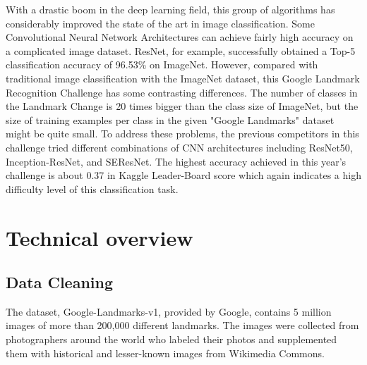 \documentclass[10pt,twocolumn,letterpaper]{article}
\begin{document}
With a drastic boom in the deep learning field, this group of algorithms has considerably improved the state of the art in image classification. Some Convolutional Neural Network Architectures can achieve fairly high accuracy on a complicated image dataset. ResNet, for example, successfully obtained a Top-5 classification accuracy of 96.53\% on ImageNet. However, compared with traditional image classification with the ImageNet dataset, this Google Landmark Recognition Challenge has some contrasting differences. The number of classes in the Landmark Change is 20 times bigger than the class size of ImageNet, but the size of training examples per class in the given "Google Landmarks" dataset might be quite small. To address these problems, the previous competitors in this challenge tried different combinations of CNN architectures including ResNet50, Inception-ResNet, and SEResNet. The highest accuracy achieved in this year's challenge is about 0.37 in Kaggle Leader-Board score which again indicates a high difficulty level of this classification task. 

\section{Technical overview}




\subsection{Data Cleaning}

The dataset, Google-Landmarks-v1, provided by Google, contains 5 million images of more than 200,000 different landmarks. The images were collected from photographers around the world who labeled their photos and supplemented them with historical and lesser-known images from Wikimedia Commons.
\end{document}

